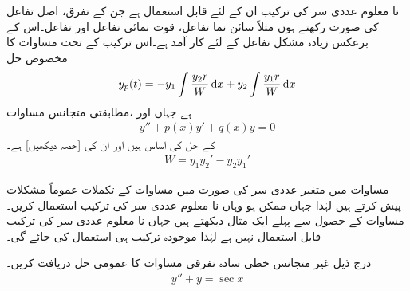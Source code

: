 نا معلوم عددی سر کی ترکیب ان  کے لئے قابل استعمال ہے جن کے تفرق، اصل تفاعل کی صورت رکھتے ہوں مثلاً سائن نما تفاعل، قوت نمائی  تفاعل اور  تفاعل۔اس کے برعکس  زیادہ مشکل تفاعل کے لئے کار آمد ہے۔اس ترکیب کے تحت مساوات  کا مخصوص حل
\begin{align}\label{مساوات_سادہ_دو_غیر_متجانس_خطی_ب}
y_p(t)=-y_1\int \frac{y_2 r}{W}\dif x+y_2\int \frac{y_1 r}{W}\dif x
\end{align}
ہے جہاں  اور  ،مطابقتی متجانس مساوات
\begin{align}\label{مساوات_سادہ_دو_غیر_متجانس_خطی_پ}
y''+p(x)y'+q(x)y=0
\end{align}
 کے حل کی اساس ہیں اور  ان کی  [حصہ  دیکھیں] ہے۔
\begin{align}\label{مساوات_سادہ_دو_غیر_متجانس_خطی_ت}
W=y_1y_2'-y_2y_1'
\end{align}

مساوات  میں متغیر عددی سر کی صورت میں مساوات  کے تکملات عموماً مشکلات  پیش کرتے ہیں لہٰذا جہاں ممکن ہو وہاں نا معلوم عددی سر کی ترکیب استعمال کریں۔مساوات  کے حصول سے پہلے ایک مثال دیکھتے ہیں جہاں نا معلوم عددی سر کی ترکیب قابل استعمال نہیں ہے لہٰذا موجودہ ترکیب ہی استعمال کی جائے گی۔

درج ذیل غیر متجانس خطی سادہ تفرقی مساوات کا عمومی حل دریافت کریں۔
\begin{align*}
y''+y=\sec x
\end{align*}
